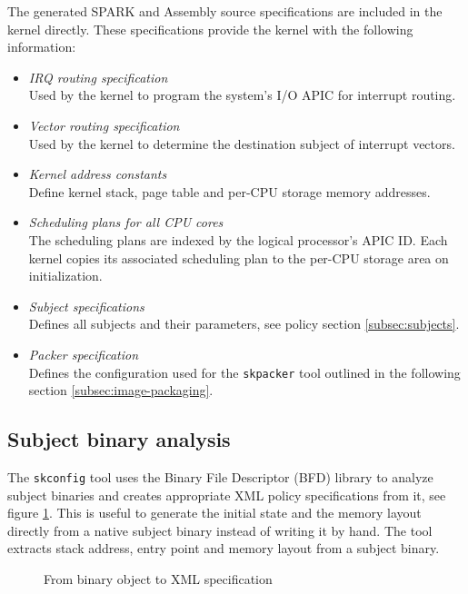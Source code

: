 The generated SPARK and Assembly source specifications are included in the
kernel directly. These specifications provide the kernel with the following
information:

\begin{itemize}
	\item \emph{IRQ routing specification}\\
		Used by the kernel to program the system's I/O APIC for interrupt
		routing.
	\item \emph{Vector routing specification}\\
		Used by the kernel to determine the destination subject of interrupt
		vectors.
	\item \emph{Kernel address constants}\\
		Define kernel stack, page table and per-CPU storage memory addresses.
	\item \emph{Scheduling plans for all CPU cores}\\
		The scheduling plans are indexed by the logical processor's APIC ID.
		Each kernel copies its associated scheduling plan to the per-CPU storage
		area on initialization.
	\item \emph{Subject specifications}\\
		Defines all subjects and their parameters, see policy section
		\ref{subsec:subjects}.
	\item \emph{Packer specification}\\
		Defines the configuration used for the \texttt{skpacker} tool outlined
		in the following section \ref{subsec:image-packaging}.
\end{itemize}

\subsection{Subject binary analysis}\label{subsec:subject-binary-analysis}
The \texttt{skconfig} tool uses the Binary File Descriptor (BFD)
library to analyze subject binaries and creates appropriate XML
policy specifications from it, see figure \ref{fig:object-analysis}. This is
useful to generate the initial state and the memory layout directly from a
native subject binary instead of writing it by hand. The tool extracts stack
address, entry point and memory layout from a subject binary.

\begin{figure}[h]
	\centering
	
	\caption{From binary object to XML specification}
	\label{fig:object-analysis}
\end{figure}


